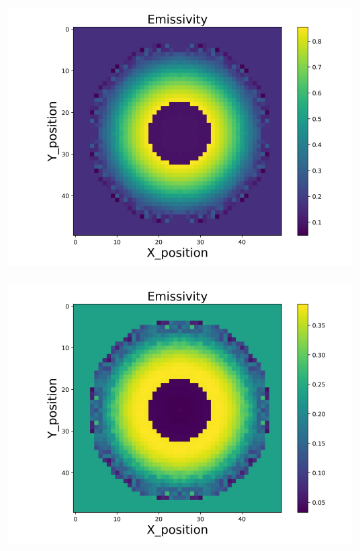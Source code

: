 \begin{figure}[p]
\begin{minipage}{\textwidth}
        \begin{subfigure}{0.325\textwidth}
            \centering
            \includegraphics[width=\textwidth]{figures/raw_data/23/exp/emi_cal.jpg}
        \end{subfigure}
        \begin{subfigure}{0.325\textwidth}
            \centering
            \includegraphics[width=\textwidth]{figures/raw_data/24/exp/emi_cal.jpg}
        \end{subfigure}
    \end{minipage}\\
    \begin{minipage}{\textwidth}

\end{minipage}
\end{figure}
